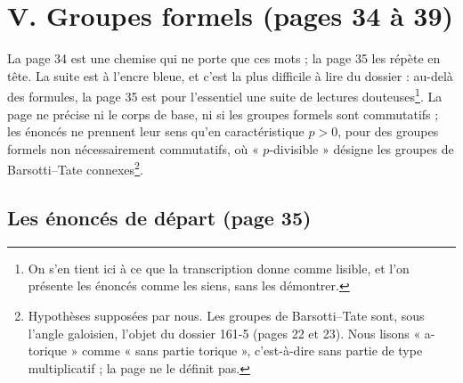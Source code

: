 \documentclass[11pt,a4paper]{article}
\begin{document}
\section*{V. Groupes formels (pages 34 à 39)}

La page 34 est une chemise qui ne porte que ces mots ; la page 35 les
répète en tête. La suite est à l'encre bleue, et c'est la plus difficile à
lire du dossier : au-delà des formules, la page 35 est pour l'essentiel
une suite de lectures douteuses\footnote{On s'en tient ici à ce que la
transcription donne comme lisible, et l'on présente les énoncés comme les
siens, sans les démontrer.}. La page ne précise ni le corps de base, ni si
les groupes formels sont commutatifs ; les énoncés ne prennent leur sens qu'en
caractéristique $p > 0$, pour des groupes formels non nécessairement
commutatifs, où « $p$-divisible » désigne les groupes de Barsotti–Tate
connexes\footnote{Hypothèses supposées par nous. Les groupes de
Barsotti–Tate sont, sous l'angle galoisien, l'objet du dossier 161-5 (pages
22 et 23). Nous lisons « a-torique » comme « sans partie torique »,
c'est-à-dire sans partie de type multiplicatif ; la page ne le définit
pas.}.

\subsection*{Les énoncés de départ (page 35)}
\end{document}
